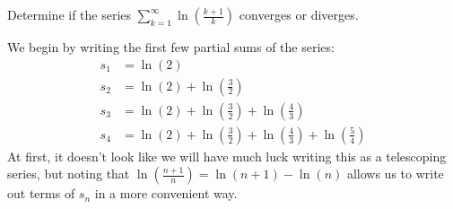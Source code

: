 \documentclass{ximera}
\begin{document}
%



\begin{example}
Determine if the series $\sum_{k=1}^\infty \ln\left(\frac{k+1}{k}\right)$ converges or diverges. 
 
\begin{explanation}
We begin by writing the first few partial sums of the series:
\begin{align*}
s_1 &= \ln\left(2\right) \\
s_2 &= \ln\left(2\right)+\ln\left(\frac32\right) \\
s_3 &= \ln\left(2\right)+\ln\left(\frac32\right)+\ln\left(\frac43\right) \\
s_4 &= \ln\left(2\right)+\ln\left(\frac32\right)+\ln\left(\frac43\right)+\ln\left(\frac54\right) 
\end{align*}
At first, it doesn't look like we will have much luck writing this as a telescoping series, but noting that $ \ln\left(\frac{n+1}{n}\right) = \ln(n+1)-\ln(n)$ allows us to write out terms of $s_n$ in a more convenient way.

  \begin{image}
  \end{image}
  

\end{explanation}
\end{example}
\end{document}
